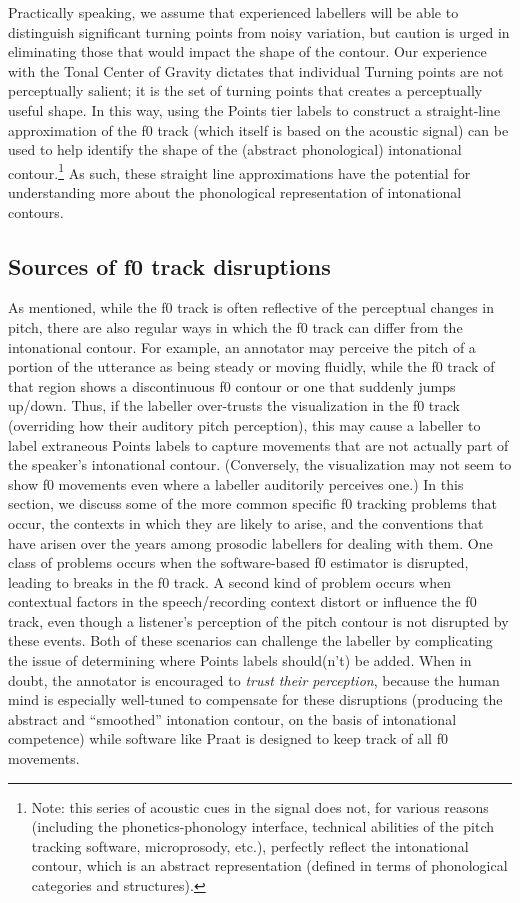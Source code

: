 \documentclass[11pt, twoside]{memoir}
\begin{document}
{{{Practically speaking, we assume that experienced labellers will be able to distinguish significant turning points from noisy variation, but caution is urged in eliminating those that would impact the shape of the contour. Our experience with the Tonal Center of Gravity dictates that individual Turning points are not perceptually salient; it is the set of turning points that creates a perceptually useful shape. 
In this way, using the Points tier labels to construct a straight-line approximation of the f0 track (which itself is based on the acoustic signal) can be used to help identify the shape of the (abstract phonological) intonational contour.\footnote{Note: this series of acoustic cues in the signal does not, for various reasons (including the phonetics-phonology interface, technical abilities of the pitch tracking software, microprosody, etc.), perfectly reflect the intonational contour, which is an abstract representation (defined in terms of phonological categories and structures).} As such, these straight line approximations have the potential for understanding more about the phonological representation of intonational contours.
\subsection{Sources of f0 track disruptions}\label{sec:a-brief-overview-of-sources-of-pitch-track-disruptions}
As mentioned, while the f0 track is often reflective of the perceptual changes in pitch, there are also regular ways in which the f0 track can differ from the intonational contour. For example, an annotator may perceive the pitch of a portion of the utterance as being steady or moving fluidly, while the f0 track of that region shows a discontinuous f0 contour or one that suddenly jumps up\slash down. Thus, if the labeller over-trusts the visualization in the f0 track (overriding how their auditory pitch perception), this may cause a labeller to label extraneous Points labels to capture movements that are not actually part of the speaker’s intonational contour. (Conversely, the visualization may not seem to show f0 movements even where a labeller auditorily perceives one.) In this section, we discuss some of the more common specific f0 tracking problems that occur, the contexts in which they are likely to arise, and the conventions that have arisen over the years among prosodic labellers for dealing with them.
One class of problems occurs when the software-based f0 estimator is disrupted, leading to breaks in the f0 track. A second kind of problem occurs when contextual factors in the speech\slash recording context distort or influence the f0 track, even though a listener’s perception of the pitch contour is not disrupted by these events. Both of these scenarios can challenge the labeller by complicating the issue of determining where Points labels should(n’t) be added.
When in doubt, the annotator is encouraged to \emph{trust their perception}, because the human mind is especially well-tuned to compensate for these disruptions (producing the abstract and “smoothed” intonation contour, on the basis of intonational competence) while software like Praat is designed to keep track of all f0 movements.
}}}
\end{document}
